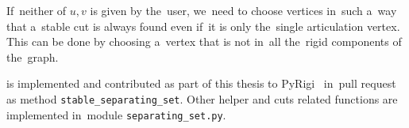If~neither of \( u, v \) is given by the~user,
we~need to choose vertices in~such a~way
that a~stable cut is always found even if~it is only the~single articulation vertex.
This can be done by choosing a~vertex that is not in~all the~rigid components of the~graph.

%
is implemented and contributed as part of this thesis
to PyRigi~\cite{pyrigi} in~pull request~\cite{pyrigi_pr_stable_cuts}
as method \texttt{stable\_separating\_set}.
Other helper and cuts related functions
are implemented in~module \texttt{separating\_set.py}.

